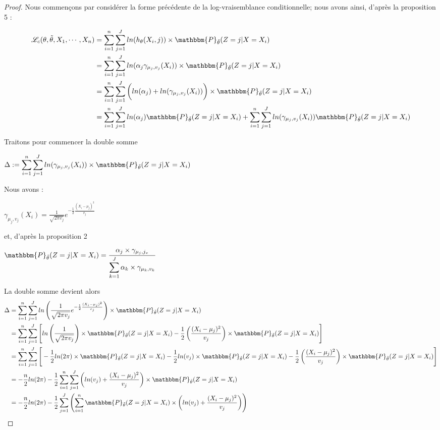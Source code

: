 \documentclass[frenchb]{report}
\newcommand{\1}{\mathbbm{1}}
\newcommand{\prob}{\mathbbm{P}}
\newcommand{\lv}{\mathcal{L}}
\newcommand{\thetat}{\tilde{\theta}}
\theoremstyle{definition}\newtheorem{defn}{Définition}
\theoremstyle{definition}\newtheorem{exm}{Exemple}
\theoremstyle{definition}\newtheorem{nota}{Notation}
\theoremstyle{definition}\newtheorem{rem}{Remarque}
\begin{document}
\begin{proof}
Nous commençons par considérer la forme précédente de la log-vraisemblance conditionnelle; nous avons ainsi, d'après la proposition 5 : 

\begin{align*}
 \lv_{c}(\theta, \thetat, X_1, \cdots, X_n) &= \sum_{i=1}^n \sum_{j = 1}^J ln(h_\theta(X_i,j)) \times\prob_{\thetat} (Z = j|X = X_i)\\
&= \sum_{i=1}^n \sum_{j = 1}^J ln(\alpha_j\gamma_{\mu_j,v_j}(X_i))\times \prob_{\thetat} (Z = j|X = X_i)\\
&= \sum_{i=1}^n \sum_{j = 1}^J \bigg(ln(\alpha_j)+ln(\gamma_{\mu_j,v_j}(X_i))\bigg)\times \prob_{\thetat} (Z = j|X = X_i)\\
&= \sum_{i=1}^n \sum_{j = 1}^J ln(\alpha_j)\prob_{\thetat} (Z = j|X = X_i)+\sum_{i=1}^n \sum_{j = 1}^J ln(\gamma_{\mu_j,v_j}(X_i))\prob_{\thetat} (Z = j|X = X_i)\\
\end{align*}

Traitons pour commencer la double somme 
\begin{center} $\Delta := \displaystyle \sum_{i=1}^n \sum_{j = 1}^J ln(\gamma_{\mu_j,v_j}(X_i))\times\prob_{\thetat} (Z = j|X = X_i)$ \end{center}

Nous avons :
\begin{center}
$\gamma_{\mu_j,v_j}(X_i) = \frac{1}{\sqrt{2 \pi v_j}}e^{-\frac{1}{2}\frac{(X_i - \mu_j)^2}{v_j}}$
\end{center}
et, d'après la proposition 2
\begin{center}
$\prob_{\thetat}(Z=j | X = X_i) = \displaystyle\frac{\alpha_j\times\gamma_{\mu_j, j_v}}{\displaystyle\sum_{k=1}^J\alpha_k\times\gamma_{\mu_k, v_k}}$
\end{center}

La double somme devient alors 
\begin{align*}
\Delta &= \sum_{i=1}^n \sum_{j = 1}^J ln\left(\frac{1}{\sqrt{2 \pi v_j}}e^{-\frac{1}{2}\frac{(X_i - \mu_j)^2}{v_j}}\right)\times\prob_{\thetat} (Z = j|X = X_i) \\
&=\sum_{i=1}^n \sum_{j = 1}^J \Bigg[ ln\left(\frac{1}{\sqrt{2 \pi v_j}}\right)\times\prob_{\thetat} (Z = j|X = X_i) -\frac{1}{2}\left(\frac{(X_i - \mu_j)^2}{v_j}\right)\times\prob_{\thetat} (Z = j|X = X_i)\Bigg]\\
&=\sum_{i=1}^n \sum_{j = 1}^J \Bigg[-\frac{1}{2} ln(2\pi)\times \prob_{\thetat} (Z = j|X = X_i)-\frac{1}{2}ln(v_j)\times \prob_{\thetat} (Z = j|X = X_i) -\frac{1}{2}\left(\frac{(X_i - \mu_j)^2}{v_j}\right)\times\prob_{\thetat} (Z = j|X = X_i) \Bigg]\\
&=-\frac{n}{2}ln(2\pi)  -\frac{1}{2} \sum_{i=1}^n \sum_{j = 1}^J \left(ln(v_j) + \frac{(X_i - \mu_j)^2}{v_j}\right)\times\prob_{\thetat} (Z = j|X = X_i) \\
&=-\frac{n}{2}ln(2\pi)  -\frac{1}{2} \sum_{j=1}^J \left( \sum_{i = 1}^n \prob_{\thetat} (Z = j|X = X_i)\times \left(ln(v_j) + \frac{(X_i - \mu_j)^2}{v_j}\right)\right) \\
\end{align*}


\end{proof}
\end{document}
